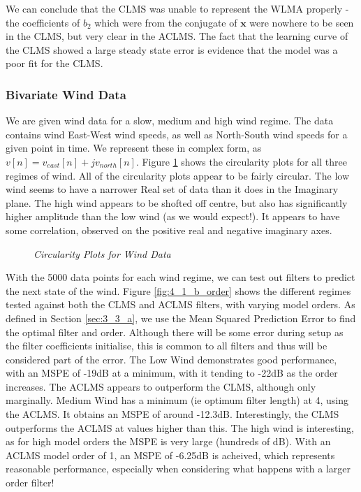 \documentclass[./main.tex]{subfiles}
\begin{document}
We can conclude that the CLMS was unable to represent the WLMA properly - the coefficients of $b_2$ which were from the conjugate of $\mathbf{x}$ were nowhere to be seen in the CLMS, but very clear in the ACLMS. The fact that the learning curve of the CLMS showed a large steady state error is evidence that the model was a poor fit for the CLMS.

\subsubsection{Bivariate Wind Data}

We are given wind data for a slow, medium and high wind regime. The data contains wind East-West wind speeds, as well as North-South wind speeds for a given point in time. We represent these in complex form, as $ v[n] = v_{east}[n] + jv_{north}[n] $. Figure \ref{fig:4_1_b_circ} shows the circularity plots for all three regimes of wind. All of the circularity plots appear to be fairly circular. The low wind seems to have a narrower Real set of data than it does in the Imaginary plane. The high wind appears to be shofted off centre, but also has significantly higher amplitude than the low wind (as we would expect!). It appears to have some correlation, observed on the positive real and negative imaginary axes.

\begin{figure}[h]
	\centering 
	\resizebox{\textwidth}{!}{}
	\caption{\textit{Circularity Plots for Wind Data}}
	\label{fig:4_1_b_circ}
\end{figure}

With the 5000 data points for each wind regime, we can test out filters to predict the next state of the wind. Figure \ref{fig:4_1_b_order} shows the different regimes tested against both the CLMS and ACLMS filters, with varying model orders. As defined in Section \ref{sec:3_3_a}, we use the Mean Squared Prediction Error to find the optimal filter and order. Although there will be some error during setup as the filter coefficients initialise, this is common to all filters and thus will be considered part of the error. The Low Wind demonstrates good performance, with an MSPE of -19dB at a minimum, with it tending to -22dB as the order increases. The ACLMS appears to outperform the CLMS, although only marginally. Medium Wind has a minimum (ie optimum filter length) at 4, using the ACLMS. It obtains an MSPE of around -12.3dB. Interestingly, the CLMS outperforms the ACLMS at values higher than this. The high wind is interesting, as for high model orders the MSPE is very large (hundreds of dB). With an ACLMS model order of 1, an MSPE of -6.25dB is acheived, which represents reasonable performance, especially when considering what happens with a larger order filter!
\end{document}
